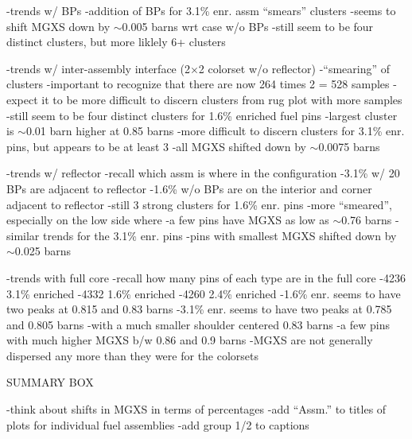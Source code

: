 -trends w/ \acp{BP}
  -addition of \acp{BP} for 3.1\% enr. assm ``smears'' clusters
  -seems to shift \ac{MGXS} down by $\sim$0.005 barns wrt case w/o \acp{BP}
  -still seem to be four distinct clusters, but more liklely 6+ clusters
  
-trends w/ inter-assembly interface (2$\times$2 colorset w/o reflector)
  -``smearing'' of clusters
  -important to recognize that there are now 264 times 2 = 528 samples
    -expect it to be more difficult to discern clusters from rug plot with more samples
  -still seem to be four distinct clusters for 1.6\% enriched fuel pins
    -largest cluster is $\sim$0.01 barn higher at 0.85 barns
  -more difficult to discern clusters for 3.1\% enr. pins, but appears to be at least 3
    -all \ac{MGXS} shifted down by $\sim$0.0075 barns 

-trends w/ reflector
  -recall which assm is where in the configuration
    -3.1\% w/ 20 \acp{BP} are adjacent to reflector
    -1.6\% w/o \acp{BP} are on the interior and corner adjacent to reflector
  -still 3 strong clusters for 1.6\% enr. pins
    -more ``smeared'', especially on the low side where
    -a few pins have \ac{MGXS} as low as $\sim$0.76 barns
  -similar trends for the 3.1\% enr. pins
    -pins with smallest \ac{MGXS} shifted down by $\sim$0.025 barns
  
-trends with full core
  -recall how many pins of each type are in the full core
    -4236 3.1\% enriched
    -4332 1.6\% enriched
    -4260 2.4\% enriched
  -1.6\% enr. seems to have two peaks at 0.815 and 0.83 barns
  -3.1\% enr. seems to have two peaks at 0.785 and 0.805 barns
    -with a much smaller shoulder centered 0.83 barns
    -a few pins with much higher \ac{MGXS} b/w 0.86 and 0.9 barns
  -\ac{MGXS} are not generally dispersed any more than they were for the colorsets
  

SUMMARY BOX

-think about shifts in \ac{MGXS} in terms of percentages
-add ``Assm.'' to titles of plots for individual fuel assemblies
-add group 1/2 to captions


